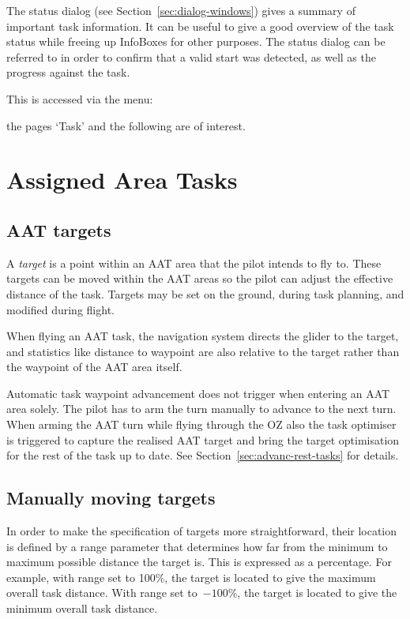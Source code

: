 The status dialog (see Section~\ref{sec:dialog-windows}) gives a
summary of important task information.  It can be useful to give a
good overview of the task status while freeing up InfoBoxes for other
purposes.  The status dialog can be referred to in order to confirm
that a valid start was detected, as well as the progress against the
task.

This is accessed via the menu:
\begin{quote}
\blink{}
\end{quote}
the pages `Task' and the following are of interest.

\section{Assigned Area Tasks}\label{sec:aat-tasks}

\subsection*{AAT targets}

A {\em target} is a point within an AAT area that the pilot intends to
fly to.  These targets can be moved within the AAT areas so the pilot
can adjust the effective distance of the task.  Targets may be set on
the ground, during task planning, and modified during flight.

When flying an AAT task, the navigation system directs the glider to
the target, and statistics like distance to waypoint are also relative
to the target rather than the waypoint of the AAT area itself.

Automatic task waypoint advancement does not trigger when entering an
AAT area solely. The pilot has to arm the turn manually to advance to the next
turn. When arming the AAT turn while flying through the OZ also the task
optimiser is triggered to capture the realised AAT target and bring the target
optimisation for the rest of the task up to date. See Section~\ref{sec:advanc-rest-tasks} for details.

\subsection*{Manually moving targets}

In order to make the specification of targets more straightforward,
their location is defined by a range parameter that determines how
far from the minimum to maximum possible distance the target is.  This
is expressed as a percentage.  For example, with range set to 100\%,
the target is located to give the maximum overall task distance.  With
range set to~$-100$\%, the target is located to give the minimum overall
task distance.  

